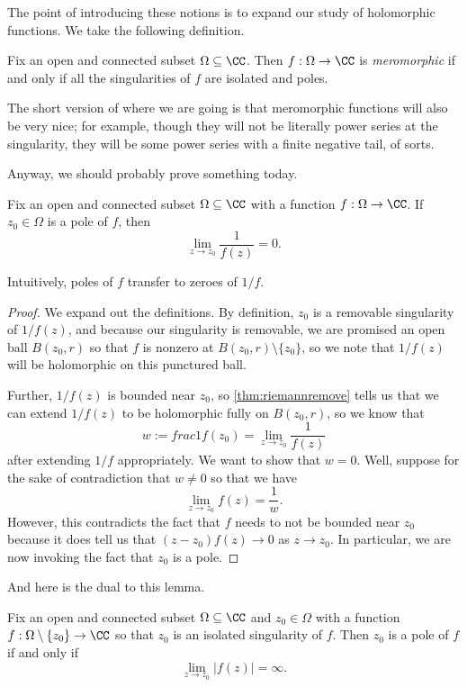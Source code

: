 The point of introducing these notions is to expand our study of holomorphic functions. We take the following definition.
\begin{definition}[Meromorphic]
	Fix an open and connected subset $\Omega\subseteq\CC$. Then $f:\Omega\to\CC$ is \textit{meromorphic} if and only if all the singularities of $f$ are isolated and poles.
\end{definition}
The short version of where we are going is that meromorphic functions will also be very nice; for example, though they will not be literally power series at the singularity, they will be some power series with a finite negative tail, of sorts.

Anyway, we should probably prove something today.
\begin{lemma} \label{lem:poletozero}
	Fix an open and connected subset $\Omega\subseteq\CC$ with a function $f:\Omega\to\CC$. If $z_0\in\Omega$ is a pole of $f$, then
	\[\lim_{z\to z_0}\frac1{f(z)}=0.\]
\end{lemma}
Intuitively, poles of $f$ transfer to zeroes of $1/f$.
\begin{proof}
	We expand out the definitions. By definition, $z_0$ is a removable singularity of $1/f(z)$, and because our singularity is removable, we are promised an open ball $B(z_0,r)$ so that $f$ is nonzero at $B(z_0,r)\setminus\{z_0\}$, so we note that $1/f(z)$ will be holomorphic on this punctured ball.
	
	Further, $1/f(z)$ is bounded near $z_0$, so \autoref{thm:riemannremove} tells us that we can extend $1/f(z)$ to be holomorphic fully on $B(z_0,r)$, so we know that
	\[w:=frac1{f(z_0)}=\lim_{z\to z_0}\frac1{f(z)}\]
	after extending $1/f$ appropriately. We want to show that $w=0$. Well, suppose for the sake of contradiction that $w\ne0$ so that we have
	\[\lim_{z\to z_0}f(z)=\frac1w.\]
	However, this contradicts the fact that $f$ needs to not be bounded near $z_0$ because it does tell us that $(z-z_0)f(z)\to0$ as $z\to z_0$. In particular, we are now invoking the fact that $z_0$ is a pole.
\end{proof}
And here is the dual to this lemma.
\begin{lemma}
	Fix an open and connected subset $\Omega\subseteq\CC$ and $z_0\in\Omega$ with a function $f:\Omega\setminus\{z_0\}\to\CC$ so that $z_0$ is an isolated singularity of $f$. Then $z_0$ is a pole of $f$ if and only if
	\[\lim_{z\to z_0}|f(z)|=\infty.\]
\end{lemma}
